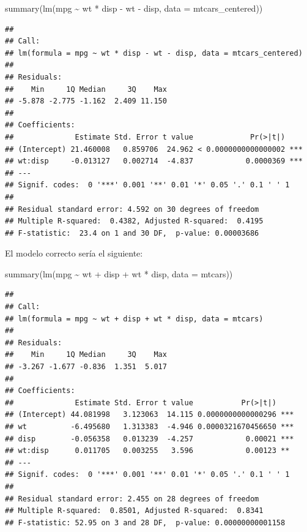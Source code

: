 \documentclass[
  12pt,
]{book}
\newenvironment{Shaded}{\begin{snugshade}}{\end{snugshade}}
\newcommand{\AttributeTok}[1]{\textcolor[rgb]{0.77,0.63,0.00}{#1}}
\newcommand{\FunctionTok}[1]{\textcolor[rgb]{0.00,0.00,0.00}{#1}}
\newcommand{\NormalTok}[1]{#1}
\newcommand{\SpecialCharTok}[1]{\textcolor[rgb]{0.00,0.00,0.00}{#1}}
\theoremstyle{definition}
\theoremstyle{definition}
\theoremstyle{definition}
\theoremstyle{remark}
\begin{document}
\begin{Shaded}
\begin{Highlighting}[]
\FunctionTok{summary}\NormalTok{(}\FunctionTok{lm}\NormalTok{(mpg }\SpecialCharTok{\textasciitilde{}}\NormalTok{ wt }\SpecialCharTok{*}\NormalTok{ disp }\SpecialCharTok{{-}}\NormalTok{ wt }\SpecialCharTok{{-}}\NormalTok{ disp, }\AttributeTok{data =}\NormalTok{ mtcars\_centered))}
\end{Highlighting}
\end{Shaded}

\begin{verbatim}
## 
## Call:
## lm(formula = mpg ~ wt * disp - wt - disp, data = mtcars_centered)
## 
## Residuals:
##    Min     1Q Median     3Q    Max 
## -5.878 -2.775 -1.162  2.409 11.150 
## 
## Coefficients:
##              Estimate Std. Error t value             Pr(>|t|)    
## (Intercept) 21.460008   0.859706  24.962 < 0.0000000000000002 ***
## wt:disp     -0.013127   0.002714  -4.837            0.0000369 ***
## ---
## Signif. codes:  0 '***' 0.001 '**' 0.01 '*' 0.05 '.' 0.1 ' ' 1
## 
## Residual standard error: 4.592 on 30 degrees of freedom
## Multiple R-squared:  0.4382, Adjusted R-squared:  0.4195 
## F-statistic:  23.4 on 1 and 30 DF,  p-value: 0.00003686
\end{verbatim}

El modelo correcto sería el siguiente:

\begin{Shaded}
\begin{Highlighting}[]
\FunctionTok{summary}\NormalTok{(}\FunctionTok{lm}\NormalTok{(mpg }\SpecialCharTok{\textasciitilde{}}\NormalTok{ wt }\SpecialCharTok{+}\NormalTok{ disp }\SpecialCharTok{+}\NormalTok{ wt }\SpecialCharTok{*}\NormalTok{ disp, }\AttributeTok{data =}\NormalTok{ mtcars))}
\end{Highlighting}
\end{Shaded}

\begin{verbatim}
## 
## Call:
## lm(formula = mpg ~ wt + disp + wt * disp, data = mtcars)
## 
## Residuals:
##    Min     1Q Median     3Q    Max 
## -3.267 -1.677 -0.836  1.351  5.017 
## 
## Coefficients:
##              Estimate Std. Error t value           Pr(>|t|)    
## (Intercept) 44.081998   3.123063  14.115 0.0000000000000296 ***
## wt          -6.495680   1.313383  -4.946 0.0000321670456650 ***
## disp        -0.056358   0.013239  -4.257            0.00021 ***
## wt:disp      0.011705   0.003255   3.596            0.00123 ** 
## ---
## Signif. codes:  0 '***' 0.001 '**' 0.01 '*' 0.05 '.' 0.1 ' ' 1
## 
## Residual standard error: 2.455 on 28 degrees of freedom
## Multiple R-squared:  0.8501, Adjusted R-squared:  0.8341 
## F-statistic: 52.95 on 3 and 28 DF,  p-value: 0.00000000001158
\end{verbatim}
\end{document}
